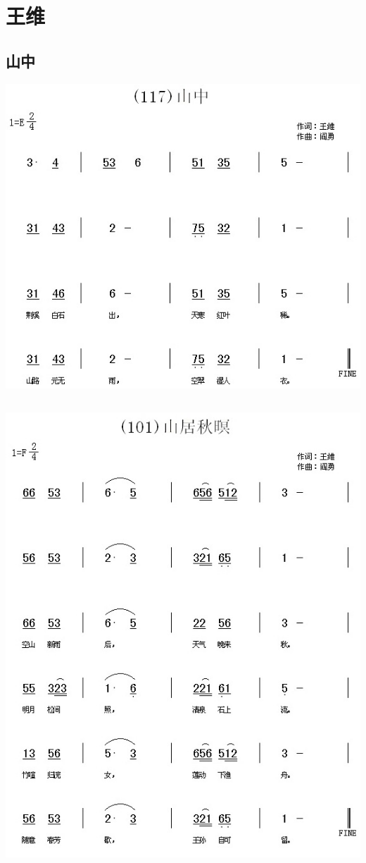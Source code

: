 \documentclass[cn,pad,chinesefont=nofont,twocol]{elegantbook}
\begin{document}
\chapter{王维}
\section{山中}
    \includegraphics[width=\textwidth]{dongxiao/20200627-王维-山中.jpg}  
\section{}
    \includegraphics[width=\textwidth]{dongxiao/20200627-王维-山居秋暝.jpg} 
\end{document}
